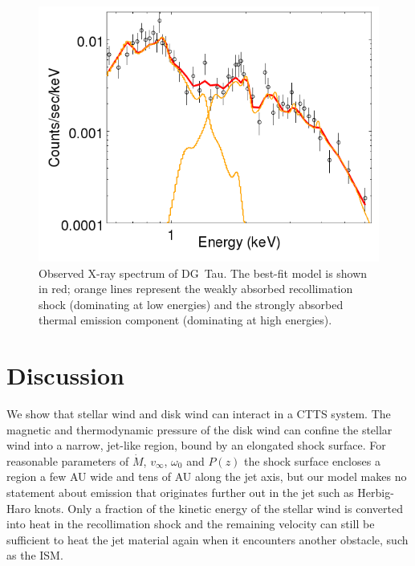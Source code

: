\documentclass[manuscript]{aastex}
\begin{document}
\begin{figure}[h!]
\begin{center}
\includegraphics[width=0.7\columnwidth]{figures/DGTaufit/DGTaufit.png}
\caption{\label{fig:fit}
Observed X-ray spectrum of DG~Tau. The best-fit model is shown in red; orange lines represent the weakly absorbed recollimation shock (dominating at low energies) and the strongly absorbed thermal emission component (dominating at high energies).}
\end{center}
\end{figure}

\section{Discussion}
\label{sect:discussion}
We show that stellar wind and disk wind can interact in a CTTS system. The magnetic and thermodynamic pressure of the disk wind can confine the stellar wind into a narrow, jet-like region, bound by an elongated shock surface. For reasonable parameters of $\dot M$, $v_\infty$, $\omega_0$ and $P(z)$ the shock surface encloses a region a few AU wide and tens of AU along the jet axis, but our model makes no statement about emission that originates further out in the jet such as Herbig-Haro knots. Only a fraction of the kinetic energy of the stellar wind is converted into heat in the recollimation shock and the remaining velocity can still be sufficient to heat the jet material again when it encounters another obstacle, such as the ISM.
\end{document}
